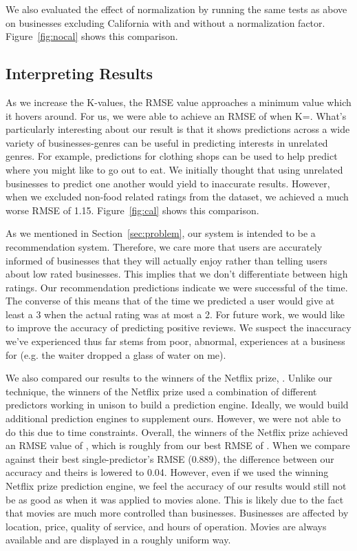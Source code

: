 We also evaluated the effect of normalization by running the same tests as
above on businesses excluding California with and without a normalization
factor. Figure~\ref{fig:nocal} shows this comparison.

\subsection{Interpreting Results}
As we increase the K-values, the RMSE value approaches a minimum value which it
hovers around. For us, we were able to achieve an RMSE of \bestRMSE when
K=\bestK.
What's particularly interesting about our result is that it shows predictions
across a wide variety of businesses-genres can be useful in predicting
interests in unrelated genres. For example, predictions for clothing shops can
be used to help predict where you might like to go out to eat. We initially
thought that using unrelated businesses to predict one another would yield to
inaccurate results. However, when we excluded non-food related ratings from the
dataset, we achieved a much worse RMSE of 1.15. Figure~\ref{fig:cal} shows this comparison.

As we mentioned in Section~\ref{sec:problem}, our system is intended to be a recommendation system. 
Therefore, we care more that users are accurately informed of businesses that they will actually enjoy rather than
telling users about low rated businesses. This implies that we don't differentiate between high ratings. Our recommendation
 predictions
indicate we were successful \posAccuracy of the time. The converse of this means
that \posInaccuracy of the time we predicted a user would give at least a 3 when the actual rating was at most a 2.  For future work,
we would like to improve the accuracy of predicting positive reviews. We suspect the inaccuracy we've experienced thus far stems
from poor, abnormal, experiences at a business for  (e.g. the waiter dropped a glass of water on me).

We also compared our results to the winners of the Netflix prize,
\cite{netprize}. Unlike our technique, the winners of the Netflix prize used a
combination of different predictors working in unison to build a prediction
engine. Ideally, we would build additional prediction engines to supplement
ours. However, we were not able to do this due to time constraints. Overall,
the winners of the Netflix prize achieved an RMSE value of \bestNetflixRMSEnsp,
which is roughly \netDiff from our best RMSE of \bestRMSEnsp. When we compare against their best 
single-predictor's RMSE (0.889), the difference between our accuracy and theirs
is lowered to 0.04. However, even if we used the winning Netflix prize prediction engine,
 we feel the accuracy of 
our results would still not be as good as when it was applied to movies alone. This is likely due to
the fact that movies are much more controlled than businesses. Businesses are
affected by location, price, quality of service, and hours of operation. Movies
are always available and are displayed in a roughly uniform way. 


